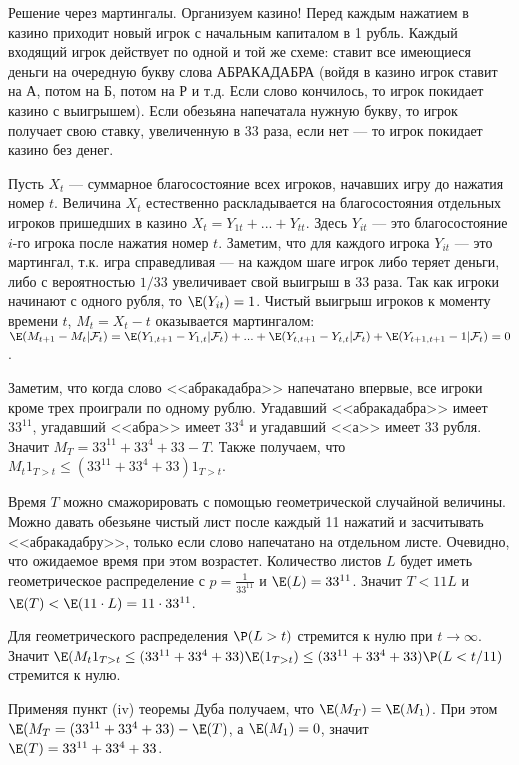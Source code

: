 Решение через мартингалы.  Организуем казино! Перед каждым нажатием в казино приходит
новый игрок с начальным капиталом в 1 рубль. Каждый входящий игрок
действует по одной и той же схеме: ставит все имеющиеся деньги на
очередную букву слова АБРАКАДАБРА (войдя в казино игрок ставит на А, потом на Б, потом на Р и т.д. Если слово кончилось, то игрок покидает казино с выигрышем). Если обезьяна напечатала нужную букву, то игрок получает свою ставку, увеличенную в 33 раза, если нет --- то игрок покидает казино без денег. 

Пусть $X_{t}$ --- суммарное благосостояние всех игроков, начавших игру до нажатия номер $t$. Величина $X_{t}$ естественно раскладывается на благосостояния отдельных игроков пришедших в казино $X_{t}=Y_{1t}+...+Y_{tt}$. Здесь $Y_{it}$ --- это благосостояние $i$-го игрока после нажатия номер $t$. Заметим, что для каждого игрока $Y_{it}$ --- это мартингал, т.к. игра справедливая --- на каждом шаге игрок либо теряет деньги, либо с вероятностью $1/33$ увеличивает свой выигрыш в 33 раза. Так как игроки начинают с одного рубля, то $\E(Y_{it})=1$. Чистый выигрыш игроков к моменту времени $t$, $M_{t}=X_{t}-t$ оказывается мартингалом: $\E(M_{t+1}-M_{t}|\mathcal{F}_{t})=\E(Y_{1,t+1}-Y_{1,t}|\mathcal{F}_{t})+...+\E(Y_{t,t+1}-Y_{t,t}|\mathcal{F}_{t})+\E(Y_{t+1,t+1}-1|\mathcal{F}_{t})=0$.

Заметим, что когда слово <<абракадабра>> напечатано впервые, все игроки кроме трех проиграли по одному рублю. Угадавший <<абракадабра>> имеет $33^{11}$, угадавший <<абра>> имеет $33^{4}$ и угадавший <<а>> имеет $33$ рубля. Значит $M_{T}=33^{11}+33^{4}+33-T$. Также получаем, что $M_{t}1_{T>t}\leq (33^{11}+33^{4}+33)1_{T>t}$.

Время $T$ можно смажорировать с помощью геометрической случайной величины. Можно давать обезьяне чистый лист после каждый 11 нажатий и засчитывать <<абракадабру>>, только если слово напечатано на отдельном листе. Очевидно, что ожидаемое время при этом возрастет. Количество листов $L$ будет иметь геометрическое распределение с $p=\frac{1}{33^{11}}$ и $\E(L)=33^{11}$. Значит $T<11L$ и $\E(T)<\E(11\cdot L)=11\cdot 33^{11}$. 

Для геометрического распределения $\P(L>t)$ стремится к нулю при $t\to\infty$. Значит $\E(M_{t}1_{T>t}\leq (33^{11}+33^{4}+33)\E(1_{T>t})\leq (33^{11}+33^{4}+33) \P(L<t/11)$ стремится к нулю.

Применяя пункт (iv) теоремы Дуба получаем, что $\E(M_{T})=\E(M_{1})$. При этом $\E(M_{T}=(33^{11}+33^{4}+33)-\E(T)$, а $\E(M_{1})=0$, значит $\E(T)=33^{11}+33^{4}+33$.

